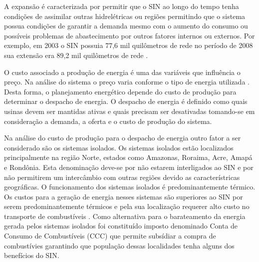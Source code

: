 A expans\~ao \'e caracterizada por permitir que o SIN ao longo do tempo tenha condi\c c\~oes de assimilar outras hidrel\'etricas ou
regi\~oes permitindo que o sistema possua condi\c c\~oes de garantir a demanda mesmo com o aumento do consumo ou
poss\'iveis problemas de abastecimento por outros fatores internos ou externos. Por exemplo, em 2003 o SIN possuia 77,6
mil quil\^ometros de rede no per\'iodo de 2008 sua extens\~ao era 89,2 mil quil\^ometros de rede \cite{an}. 

O custo associado a produ\c c\~ao de energia \'e uma das vari\'aveis que influ\^encia o pre\c co. Na an\'alise do
sistema o pre\c co varia conforme o tipo de energia utilizada \cite{an}. Desta forma, o planejamento energ\'etico
depende do custo de produ\c c\~ao para determinar o despacho de energia. O despacho de energia \'e definido como quais
usinas devem ser mantidas ativas e quais precisam ser desativadas tomando-se em considera\c c\~ao a demanda, a oferta e
o custo de produ\c c\~ao do sistema.

Na an\'alise do custo de produ\c c\~ao para o despacho de energia outro fator a ser considerado s\~ao os sistemas
isolados. Os sistemas isolados est\~ao localizados principalmente na regi\~ao Norte,
estados como Amazonas, Roraima, Acre, Amap\'a e Rond\^onia. Esta denomina\c c\~ao deve-se por n\~ao estarem interligados ao
SIN e por n\~ao permitirem um interc\^ambio com outras regi\~oes devido as caracter\'istricas geogr\'aficas. O
funcionamento dos sistemas isolados \'e predominantemente t\'ermico. Os custos para a gera\c c\~ao de energia nesses sistemas s\~ao
superiores ao SIN por serem predominantemente t\'ermicos e pela sua localiza\c c\~ao requerer alto custo no
transporte de combust\'iveis \cite{an}. Como alternativa para o barateamento da energia gerada pelos sistemas isolados
foi constitu\'ido imposto denominado Conta de Consumo de Combust\'iveis (CCC) que permite subs\'idiar a compra de
combust\'ivies garantindo que popula\c c\~ao dessas localidades tenha alguns dos benef\'icios do SIN. 

